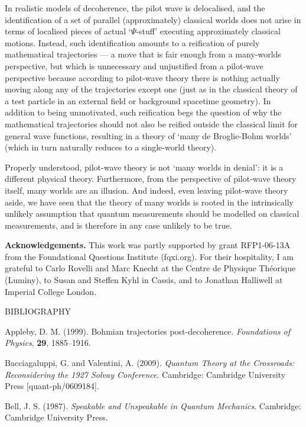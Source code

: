 \documentclass[12pt]{article}%
\begin{document}
In realistic models of decoherence, the pilot wave is delocalised, and the
identification of a set of parallel (approximately) classical worlds does not
arise in terms of localised pieces of actual `$\Psi$-stuff' executing
approximately classical motions. Instead, such identification amounts to a
reification of purely mathematical trajectories --- a move that is fair enough
from a many-worlds perspective, but which is unnecessary and unjustified from
a pilot-wave perspective because according to pilot-wave theory there is
nothing actually moving along any of the trajectories except one (just as in
the classical theory of a test particle in an external field or background
spacetime geometry). In addition to being unmotivated, such reification begs
the question of why the mathematical trajectories should not also be reified
outside the classical limit for general wave functions, resulting in a theory
of `many de Broglie-Bohm worlds' (which in turn naturally reduces to a
single-world theory).

Properly understood, pilot-wave theory is not `many worlds in denial': it is a
different physical theory. Furthermore, from the perspective of pilot-wave
theory itself, many worlds are an illusion. And indeed, even leaving
pilot-wave theory aside, we have seen that the theory of many worlds is rooted
in the intrinsically unlikely assumption that quantum measurements should be
modelled on classical measurements, and is therefore in any case unlikely to
be true.

\textbf{Acknowledgements.} This work was partly supported by grant RFP1-06-13A
from the Foundational Questions Institute (fqxi.org). For their hospitality, I
am grateful to Carlo Rovelli and Marc Knecht at the Centre de Physique
Th\'{e}orique (Luminy), to Susan and Steffen Kyhl in Cassis, and to Jonathan
Halliwell at Imperial College London.

\begin{center}
BIBLIOGRAPHY
\end{center}

Appleby, D. M. (1999). Bohmian trajectories post-decoherence.
\textit{Foundations of Physics}, \textbf{29}, 1885--1916.

Bacciagaluppi, G. and Valentini, A. (2009). \textit{Quantum Theory at the
Crossroads: Reconsidering the 1927 Solvay Conference}. Cambridge: Cambridge
University Press [quant-ph/0609184].

Bell, J. S. (1987). \textit{Speakable and Unspeakable in Quantum Mechanics}.
Cambridge: Cambridge University Press.
\end{document}
